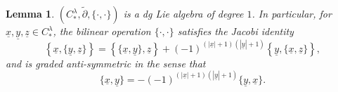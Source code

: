 \documentclass[a4paper]{article}
\newtheorem{lemma}[theorem]{Lemma}
\numberwithin{equation}{section}
\begin{document}
\begin{lemma}
$\left(C_\ast^\lambda,\tilde{\partial},\{\cdot,\cdot\}\right)$ is a dg Lie algebra of degree $1$. In particular, for $\underline{x},\underline{y},\underline{z}\in C_\ast^\lambda$, the bilinear operation $\{\cdot,\cdot\}$ satisfies the Jacobi identity
\begin{equation}\label{eq:Jacobi}
\left\{\underline{x},\{\underline{y},\underline{z}\}\right\}=\left\{\{\underline{x},\underline{y}\},\underline{z}\right\}+(-1)^{(|\underline{x}|+1)(|\underline{y}|+1)}\left\{\underline{y},\{\underline{x},\underline{z}\}\right\},
\end{equation}
and is graded anti-symmetric in the sense that
\begin{equation}\label{eq:anti-sym}
\{\underline{x},\underline{y}\}=-(-1)^{(|\underline{x}|+1)(|\underline{y}|+1)}\{\underline{y},\underline{x}\}.
\end{equation}
\end{lemma}
\end{document}
